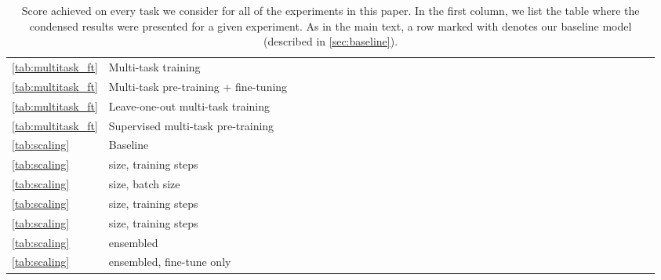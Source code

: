 \documentclass[twoside,11pt]{article}
\newcommand{\bsl}{\makebox[0pt][r]{\raisebox{0.05em}{}}}
\begin{document}
\begin{table}[!ht]
\begin{minipage}{0.85\pdfpagewidth}
\begin{tabular}{llccccccccccccccccccccccccccccccccc}
\ref{tab:multitask_ft} & Multi-task training &  &  &  &  &  &  &  &  &  &  &  &  &  &  &  &  &  &  &  &  &  &  &  &  &  &  &  &  &  &  &  &  &  \\
\ref{tab:multitask_ft} & Multi-task pre-training + fine-tuning &  &  &  &  &  &  &  &  &  &  &  &  &  &  &  &  &  &  &  &  &  &  &  &  &  &  &  &  &  &  &  &  &  \\
\ref{tab:multitask_ft} & Leave-one-out multi-task training &  &  &  &  &  &  &  &  &  &  &  &  &  &  &  &  &  &  &  &  &  &  &  &  &  &  &  &  &  &  &  &  &  \\
\ref{tab:multitask_ft} & Supervised multi-task pre-training &  &  &  &  &  &  &  &  &  &  &  &  &  &  &  &  &  &  &  &  &  &  &  &  &  &  &  &  &  &  &  &  &  \\
\cmidrule(r){1-2} \cmidrule(lr){3-15} \cmidrule(lr){16-18} \cmidrule(lr){19-20} \cmidrule(lr){21-32} \cmidrule(l){33-35}
\ref{tab:scaling} & \bsl Baseline &  &  &  &  &  &  &  &  &  &  &  &  &  &  &  &  &  &  &  &  &  &  &  &  &  &  &  &  &  &  &  &  &  \\
\ref{tab:scaling} &  size,  training steps &  &  &  &  &  &  &  &  &  &  &  &  &  &  &  &  &  &  &  &  &  &  &  &  &  &  &  &  &  &  &  &  &  \\
\ref{tab:scaling} &  size,  batch size &  &  &  &  &  &  &  &  &  &  &  &  &  &  &  &  &  &  &  &  &  &  &  &  &  &  &  &  &  &  &  &  &  \\
\ref{tab:scaling} &  size,  training steps &  &  &  &  &  &  &  &  &  &  &  &  &  &  &  &  &  &  &  &  &  &  &  &  &  &  &  &  &  &  &  &  &  \\
\ref{tab:scaling} &  size,  training steps &  &  &  &  &  &  &  &  &  &  &  &  &  &  &  &  &  &  &  &  &  &  &  &  &  &  &  &  &  &  &  &  &  \\
\ref{tab:scaling} &  ensembled &  &  &  &  &  &  &  &  &  &  &  &  &  &  &  &  &  &  &  &  &  &  &  &  &  &  &  &  &  &  &  &  &  \\
\ref{tab:scaling} &  ensembled, fine-tune only &  &  &  &  &  &  &  &  &  &  &  &  &  &  &  &  &  &  &  &  &  &  &  &  &  &  &  &  &  &  &  &  &  \\
\bottomrule
\end{tabular}
\caption{
Score achieved on every task we consider for all of the experiments in this paper.
In the first column, we list the table where the condensed results were presented for a given experiment.
As in the main text, a row marked with  denotes our baseline model (described in \cref{sec:baseline}).
}\label{tab:giant}
\end{minipage}
\end{table}

\clearpage

\eject \pdfpagewidth=8.5in \pdfpageheight=11in


\end{document}
